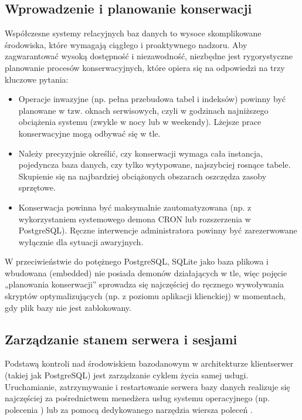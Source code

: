 \documentclass[letterpaper,10pt,polish]{sphinxmanual}
\begin{document}
\subsection{Wprowadzenie i planowanie konserwacji}
\label{\detokenize{rozdzia_u0142_2/rozdzia_u0142_23/index:wprowadzenie-i-planowanie-konserwacji}}
\sphinxAtStartPar
Współczesne systemy relacyjnych baz danych to wysoce skomplikowane środowiska, które wymagają ciągłego i proaktywnego nadzoru. Aby zagwarantować wysoką dostępność i niezawodność, niezbędne jest rygorystyczne planowanie procesów konserwacyjnych, które opiera się na odpowiedzi na trzy kluczowe pytania:
\begin{itemize}
\item {} 
\sphinxAtStartPar
{} Operacje inwazyjne (np. pełna przebudowa tabel i indeksów) powinny być planowane w tzw. oknach serwisowych, czyli w godzinach najniższego obciążenia systemu (zwykle w nocy lub w weekendy). Lżejsze prace konserwacyjne mogą odbywać się w tle.

\item {} 
\sphinxAtStartPar
{} Należy precyzyjnie określić, czy konserwacji wymaga cała instancja, pojedyncza baza danych, czy tylko wytypowane, najszybciej rosnące tabele. Skupienie się na najbardziej obciążonych obszarach oszczędza zasoby sprzętowe.

\item {} 
\sphinxAtStartPar
{} Konserwacja powinna być maksymalnie zautomatyzowana (np. z wykorzystaniem systemowego demona CRON lub rozszerzenia  w PostgreSQL). Ręczne interwencje administratora powinny być zarezerwowane wyłącznie dla sytuacji awaryjnych.

\end{itemize}

\sphinxAtStartPar
{} W przeciwieństwie do potężnego PostgreSQL, SQLite jako baza plikowa i wbudowana (embedded) nie posiada demonów działających w tle, więc pojęcie „planowania konserwacji” sprowadza się najczęściej do ręcznego wywoływania skryptów optymalizujących (np. z poziomu aplikacji klienckiej) w momentach, gdy plik bazy nie jest zablokowany.


\subsection{Zarządzanie stanem serwera i sesjami}
\label{\detokenize{rozdzia_u0142_2/rozdzia_u0142_23/index:zarzadzanie-stanem-serwera-i-sesjami}}
\sphinxAtStartPar
Podstawą kontroli nad środowiskiem bazodanowym w architekturze klient\sphinxhyphen{}serwer (takiej jak PostgreSQL) jest zarządzanie cyklem życia samej usługi. Uruchamianie, zatrzymywanie i restartowanie serwera bazy danych realizuje się najczęściej za pośrednictwem menedżera usług systemu operacyjnego (np. polecenia ) lub za pomocą dedykowanego narzędzia wiersza poleceń .
\end{document}
